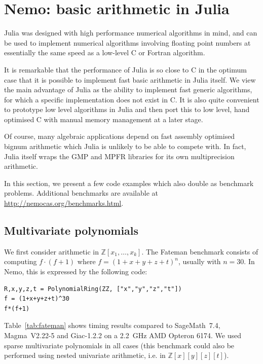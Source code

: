 \documentclass{sig-alternate-05-2015}
\begin{document}
\section{Nemo: basic arithmetic in Julia}

Julia was designed with high performance numerical algorithms in mind, and can be used to
implement numerical algorithms involving floating point numbers at essentially the same
speed as a low-level C or Fortran algorithm. 

It is remarkable that the performance of Julia is so close to C in the optimum case that
it is possible to implement fast basic arithmetic in Julia itself. We view the main
advantage of Julia as the ability to implement fast generic algorithms, for which a specific
implementation does not exist in C. It is also quite convenient to prototype low level
algorithms in Julia and then port this to low level, hand optimised C with manual memory
management at a later stage.

Of course, many algebraic applications depend on fast assembly optimised bignum arithmetic
which Julia is unlikely to be able to compete with. In fact, Julia itself wraps the GMP
\cite{gmp} and MPFR \cite{mpfr} libraries for its own multiprecision arithmetic.

In this section, we present a few code examples which also double as
benchmark problems.
Additional benchmarks are available
at \url{http://nemocas.org/benchmarks.html}.

\subsection{Multivariate polynomials}

We first consider arithmetic in $\mathbb{Z}[x_1,\ldots,x_k]$.
The Fateman benchmark consists of computing
$f \cdot (f+1)$ where $f = (1 + x + y + z + t)^n$,
usually with $n = 30$. In Nemo, this is expressed by the following code:

\begin{verbatim}
R,x,y,z,t = PolynomialRing(ZZ, ["x","y","z","t"])
f = (1+x+y+z+t)^30
f*(f+1)
\end{verbatim}

Table~\ref{tab:fateman} shows timing results compared to
SageMath~7.4, Magma~V2.22-5 and Giac-1.2.2
on a 2.2~GHz AMD Opteron 6174.
We used sparse multivariate polynomials in all
cases (this benchmark could also be performed
using nested univariate arithmetic, i.e. in $\mathbb{Z}[x][y][z][t]$).
\end{document}
